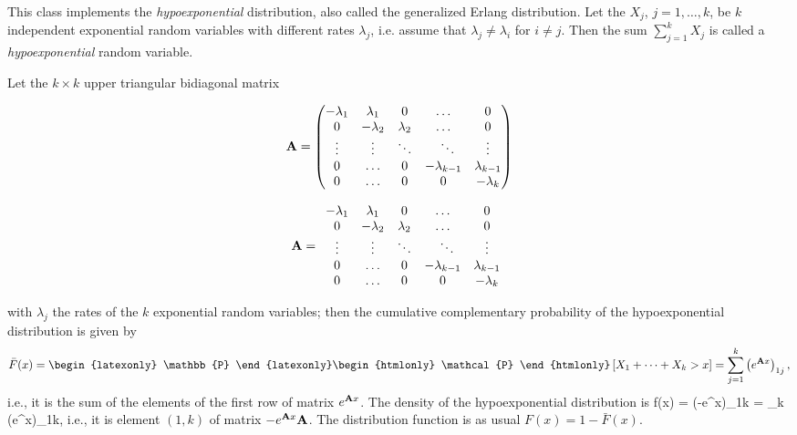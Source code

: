 
This class implements the \emph{hypoexponential} distribution,
also called the generalized Erlang  distribution. Let the $X_j$,
$j=1,\ldots,k$, be $k$ independent exponential random variables with different
rates $\lambda_j$, i.e. assume that $\lambda_j \neq \lambda_i$ for
$i \neq j$. Then the sum $\sum_{j=1}^kX_j$ is called a \emph{hypoexponential}
random variable.

Let the  $k\times k$ upper triangular bidiagonal matrix
%
\begin{latexonly}%
\begin{equation}
\label{eq:tail-hypomatrix}
  \mathbf{A} = \begin{pmatrix}
   -\lambda_1 & \lambda_1 & 0 & \ldots & 0 \\
   0 & -\lambda_2& \lambda_2 & \ldots &  0 \\
   \vdots &  \vdots & \ddots & ~~\ddots & \vdots   \\
   0 & \ldots  & 0 &  -\lambda_{k-1} & \lambda_{k-1} \\
   0 & \ldots  & 0 &   0 & -\lambda_k
  \end{pmatrix}
\end{equation}
\end{latexonly}%
%
\begin{htmlonly}%
\begin{equation}
\label{eq:tail-hypomatrix}
  \mathbf{A} = \begin{array}{ccccc}
   -\lambda_1 & \lambda_1 & 0 & \ldots & 0 \\
   0 & -\lambda_2& \lambda_2 & \ldots &  0 \\
   \vdots &  \vdots & \ddots & ~~\ddots & \vdots   \\
   0 & \ldots  & 0 &  -\lambda_{k-1} & \lambda_{k-1} \\
   0 & \ldots  & 0 &   0 & -\lambda_k
  \end{array}
\end{equation}
\end{htmlonly}%
%
with  $\lambda_j$ the rates of the $k$ exponential random variables;
then the cumulative complementary probability of the hypoexponential
distribution is given by \cite{pNEU81a,pLAT99a}
\begin{equation}
\label{eq:tail-hypoexp}
\bar F(x) = 
\begin{latexonly} \mathbb{P} \end{latexonly}
\begin{htmlonly} \mathcal{P} \end{htmlonly}
\left[X_1 + \cdots + X_k > x \right] =
\sum_{j=1}^k \left(e^{\bA x}\right)_{1j},
\end{equation}
%
i.e., it is the sum of the elements of the first row of matrix $e^{\mathbf{A} x}$.
The density of the hypoexponential distribution is
\eq  f(x) = \left(-e^{\bA x}\bA\right)_{1k} =
      \lambda_k  \left(e^{\bA x}\right)_{1k},
\endeq
%
i.e., it is element $(1,k)$ of matrix $-e^{\mathbf{A} x}\mathbf{A}$.
The distribution function is as usual $F(x) = 1 - \bar F(x)$.

